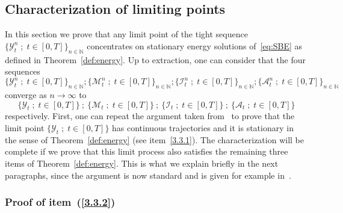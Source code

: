 \documentclass[10pt]{amsart}
\theoremstyle{definition}\newtheorem{defi}[theo]{Definition}\newtheorem{rema}[theo]{Remark}\newtheorem{exam}[theo]{Example}\newtheorem{exem}[theo]{Example}\newtheorem{nota}[theo]{Notation}
\begin{document}
\subsection{Characterization of limiting points}\label{sec:charact}

In this section we prove that any limit point of the tight sequence $\{{\mathcal Y}_t^n\; ; \; t \in [0,T]\}_{n\in\mathbb{N}}$ concentrates on stationary energy solutions of~\eqref{eq:SBE} as defined in Theorem~\ref{def:energy}. Up to extraction, one can consider that the four sequences
\[
\{{\mathcal Y}_t^n\; ; \; t \in [0,T]\}_{n\in\mathbb{N}};\{{\mathcal M}_t^n\; ; \; t \in [0,T]\}_{n\in\mathbb{N}} ; \{{\mathcal I}_t^n\; ; \; t \in [0,T]\}_{n\in\mathbb{N}}; \{{{\mathcal A}_t^n}\; ; \; t \in [0,T]\}_{n\in\mathbb{N}}
\]
converge as $n \to \infty$ to
\[
\{{\mathcal Y}_t\; ; \; t \in [0,T]\}\ ;\ \{{\mathcal M}_t\; ; \; t \in [0,T]\}\ ;\ \{{\mathcal I}_t\; ; \; t \in [0,T]\}\ ;\ \{{{\mathcal A}_t}\; ; \; t \in [0,T]\}
\]
respectively. First, one can repeat the argument taken from~\cite[Section~5.3]{gj2014} to prove that the limit point $\{{\mathcal Y}_t\; ; \; t \in [0,T]\}$ has continuous trajectories and it is stationary in the sense of Theorem~\ref{def:energy} (see item~\eqref{3.3.1}). The characterization will be complete if we prove that this limit process also satisfies the remaining three items of Theorem~\ref{def:energy}. This is what we explain briefly in the next paragraphs, since the argument is now standard and is given for example in~\cite{fgsimon2015,gj2014,GJS}.

\subsubsection{Proof of item~(\ref{3.3.2})}
\end{document}
